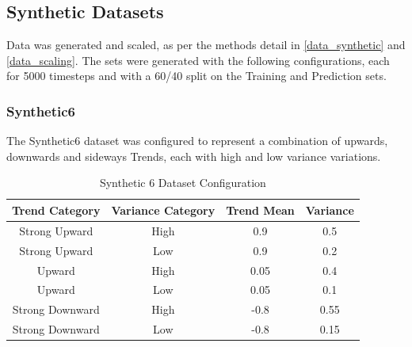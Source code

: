 \documentclass[a4paper,11pt,oneside]{article}
\theoremstyle{plain}
\theoremstyle{definition}
\begin{document}
	\subsection{Synthetic Datasets}
	
	Data was generated and scaled, as per the methods detail in \ref{data_synthetic} and \ref{data_scaling}. The sets were generated with the following configurations, each for 5000 timesteps and with a 60/40 split on the Training and Prediction sets.
	
	\subsubsection{Synthetic6} \label{dataset_synthetic6}
	
	The Synthetic6 dataset was configured to represent a combination of upwards, downwards and sideways Trends, each with high and low variance variations.
	
	\begin{table}[h]
		\centering
		\small
		\begin{tabular}{|c|c|c|c|}
			\hline
			\textbf{Trend Category} &\textbf{Variance Category} & \textbf{Trend Mean} & \textbf{Variance}\\\hline	
			{Strong Upward} & {High} & {0.9} & {0.5} \\\hline
			{Strong Upward} & {Low} & {0.9} & {0.2} \\\hline
			{Upward} & {High} & {0.05} & {0.4} \\\hline
			{Upward} & {Low} & {0.05} & {0.1} \\\hline
			{Strong Downward} & {High} & {-0.8} & {0.55} \\\hline
			{Strong Downward} & {Low} & {-0.8} & {0.15} \\\hline
		\end{tabular}
		\newline\newline
		\caption{Synthetic 6 Dataset Configuration}\label{tab_synth6}
	\end{table}
	
\end{document}
